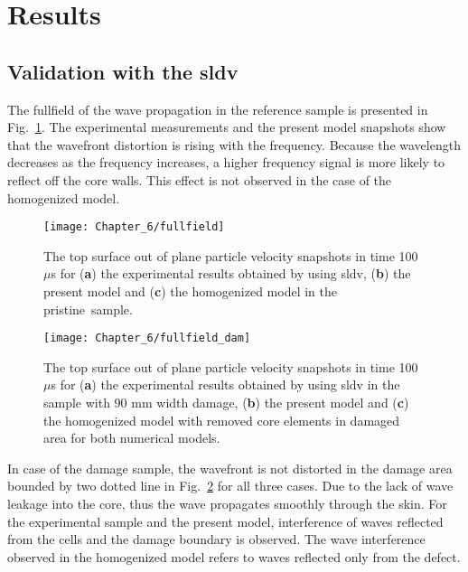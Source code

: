 \section{Results}
\label{sec:resuls}

\subsection{Validation with the \ac{sldv}}
The fullfield of the wave propagation in the reference sample is presented in Fig.~\ref{fig:wavefield}.
The experimental measurements and the present model snapshots show that the wavefront distortion is rising with the frequency.
Because the wavelength decreases as the frequency increases, a higher frequency signal is more likely to reflect off the core walls.
This effect is not observed in the case of the homogenized model.
\vspace{-6pt}
\begin{figure}[H]
	\begin{center}
		\texttt{[image: Chapter\_6/fullfield]}
	\end{center}
	\caption{The top surface out of plane particle velocity snapshots in time 100 \(\mu\)s for (\textbf{a}) the experimental results obtained by using \ac{sldv}, (\textbf{b}) the present model and (\textbf{c}) the homogenized model in the pristine~sample.}
	\label{fig:wavefield}
\end{figure}

\begin{figure}[H]
	\begin{center}
		\texttt{[image: Chapter\_6/fullfield\_dam]}
	\end{center}
	\caption{The top surface out of plane particle velocity snapshots in time 100~\(\mu\)s for (\textbf{a}) the experimental results obtained by using \ac{sldv} in the sample with 90 mm width damage, (\textbf{b}) the present model and (\textbf{c}) the homogenized model with removed core elements in damaged area for both numerical models.}
	\label{fig:wavefield_dam5}
\end{figure}

In case of the damage sample, the wavefront is not distorted in the damage area bounded by two dotted line in Fig.~\ref{fig:wavefield_dam5} for all three cases.
Due to the lack of wave leakage into the core, thus the wave propagates smoothly through the skin.
For the experimental sample and the present model, interference of waves reflected from the cells and the damage boundary is observed.
The wave interference observed in the homogenized model refers to waves reflected only from the defect.

